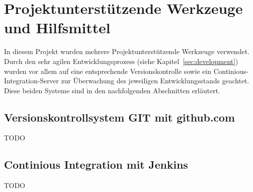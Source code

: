 \section{Projektunterstützende Werkzeuge und Hilfsmittel}
\label{sec:tools}

In diesem Projekt wurden mehrere Projektunterstützende Werkzeuge verwendet.
	Durch den sehr agilen Entwicklungsprozess (siehe Kapitel~\ref{sec:development})
	wurden vor allem auf eine entsprechende Versionskontrolle sowie ein
	Continious-Integration-Server zur Überwachung des jeweiligen Entwicklungsstands
	geachtet. Diese beiden Systeme sind in den nachfolgenden Abschnitten erläutert.

\subsection{Versionskontrollsystem GIT mit github.com}
\label{subsec:git}

TODO

\subsection{Continious Integration mit Jenkins}
\label{subsec:ci}

TODO

